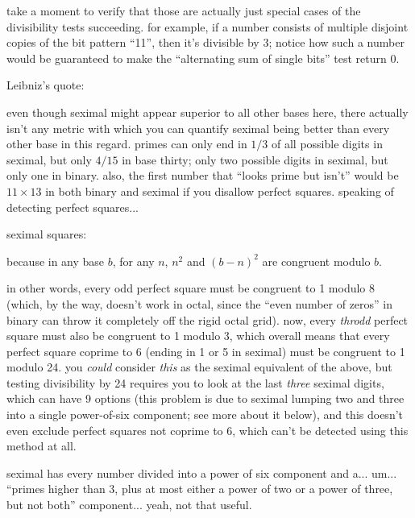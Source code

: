 \documentclass[../footnotes.tex]{subfiles}
\begin{document}
\myfootnote{} take a moment to verify that those are actually just special cases of the divisibility tests succeeding. for example, if a number consists of multiple disjoint copies of the bit pattern ``11'', then it's divisible by 3; notice how such a number would be guaranteed to make the ``alternating sum of single bits'' test return 0.

\myfootnote{} Leibniz's quote: \\

\myfootnote{} even though seximal might appear superior to all other bases here, there actually isn't any metric with which you can quantify seximal being better than every other base in this regard. primes can only end in $1/3$ of all possible digits in seximal, but only $4/15$ in base thirty; only two possible digits in seximal, but only one in binary. also, the first number that ``looks prime but isn't'' would be $11 \times 13$ in both binary and seximal if you disallow perfect squares. speaking of detecting perfect squares...

\myfootnote{} seximal squares: \\

\myfootnote{} because in any base $b$, for any $n$, $n^2$ and $(b - n)^2$ are congruent modulo $b$.

\myfootnote{} in other words, every odd perfect square must be congruent to 1 modulo 8 (which, by the way, doesn't work in octal, since the ``even number of zeros'' in binary can throw it completely off the rigid octal grid). now, every \emph{throdd} perfect square must also be congruent to 1 modulo 3, which overall means that every perfect square coprime to 6 (ending in 1 or 5 in seximal) must be congruent to 1 modulo 24. you \emph{could} consider \emph{this} as the seximal equivalent of the above, but testing divisibility by 24 requires you to look at the last \emph{three} seximal digits, which can have 9 options (this problem is due to seximal lumping two and three into a single power-of-six component; see more about it below), and this doesn't even exclude perfect squares not coprime to 6, which can't be detected using this method at all.

\myfootnote{} seximal has every number divided into a power of six component and a... um... ``primes higher than 3, plus at most either a power of two or a power of three, but not both'' component... yeah, not that useful.
\end{document}
